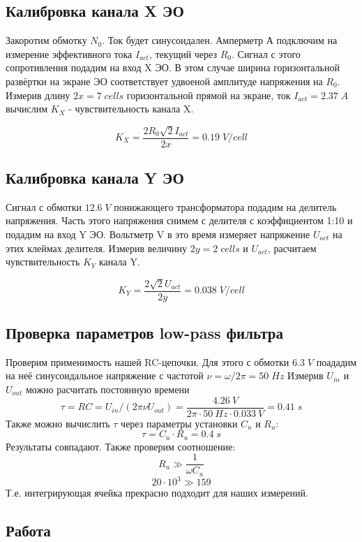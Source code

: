 \documentclass{article}
\begin{document}
\subsection{Калибровка канала X ЭО}

Закоротим обмотку \(N_0\). Ток будет синусоидален. Амперметр А подключим на измерение эффективного тока \(I_{act}\),
текущий через \(R_0\). Сигнал с этого сопротивления подадим на вход X ЭО. В этом случае ширина горизонтальной
развёртки на экране ЭО соответствует удвоеной амплитуде напряжения на \(R_0\). Измерив длину \(2x = 7\; cells\)
горизонтальной прямой на экране, ток \(I_{act} = 2.37\; A\) вычислим \(K_X\) - чувствительность канала X.

\[ K_X = \frac{2R_0\sqrt{2}I_{act}}{2x} = 0.19\; V/cell\]

\subsection{Калибровка канала Y ЭО}

Сигнал с обмотки $12.6\; V$ понижающего трансформатора подадим на делитель напряжения. Часть этого напряжения снимем
с делителя с коэффициентом 1:10 и подадим  на вход Y ЭО. Вольтметр V в это время измеряет напряжение \(U_{act}\) на
этих клеймах делителя. Измерив величину \(2y = 2\; cells\) и \(U_{act}\), расчитаем чувствительность \(K_Y\) канала Y.

\[ K_Y = \frac{2\sqrt{2}U_{act}}{2y} = 0.038\; V/cell \]

\subsection {Проверка параметров low-pass фильтра}
Проверим применимость нашей RC-цепочки. Для этого с обмотки \(6.3\; V\) поададим на неё синусоидальное напряжение
с частотой \( \nu = \omega/2\pi = 50\; Hz\)
Измерив \( U_{in} \) и \( U_{out} \) можно расчитать постоянную времени
\[ \tau = RC = U_{in}/(2\pi \nu U_{out})  = \frac{4.26\: V}{2\pi\cdot 50\: Hz \cdot 0.033\:V} = 0.41\; s\]
Также можно вычислить \(\tau\) через параметры установки \(C_u\) и \(R_u\):
\[ \tau = C_u\cdot R_u = 0.4\; s\]
Результаты совпадают. Также проверим соотношение:
\[ R_u \gg \frac{1}{\omega C_u} \]
\[ 20\cdot 10^3 \gg 159 \]
Т.е. интегрирующая ячейка прекрасно подходит для наших измерений.
\subsection{Работа}
\end{document}
